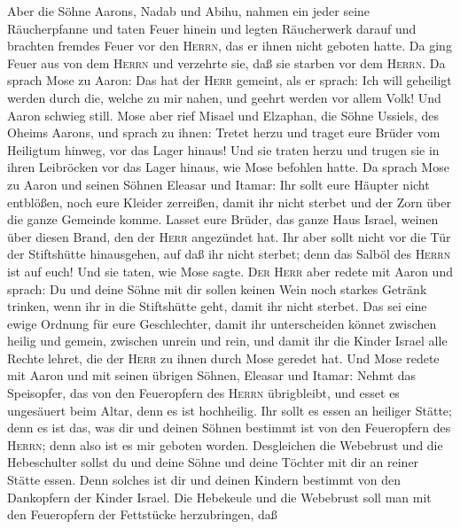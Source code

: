  Aber die Söhne Aarons, Nadab und Abihu, nahmen ein jeder
seine Räucherpfanne und taten Feuer hinein und legten Räucherwerk darauf
und brachten fremdes Feuer vor den \textsc{Herrn}, das er ihnen nicht
geboten hatte.  Da ging Feuer aus von dem \textsc{Herrn}
und verzehrte sie, daß sie starben vor dem \textsc{Herrn}.
 Da sprach Mose zu Aaron: Das hat der \textsc{Herr}
gemeint, als er sprach: Ich will geheiligt werden durch die, welche zu
mir nahen, und geehrt werden vor allem Volk! Und Aaron schwieg still.
 Mose aber rief Misael und Elzaphan, die Söhne Ussiels,
des Oheims Aarons, und sprach zu ihnen: Tretet herzu und traget eure
Brüder vom Heiligtum hinweg, vor das Lager hinaus!  Und
sie traten herzu und trugen sie in ihren Leibröcken vor das Lager
hinaus, wie Mose befohlen hatte.  Da sprach Mose zu Aaron
und seinen Söhnen Eleasar und Itamar: Ihr sollt eure Häupter nicht
entblößen, noch eure Kleider zerreißen, damit ihr nicht sterbet und der
Zorn über die ganze Gemeinde komme. Lasset eure Brüder, das ganze Haus
Israel, weinen über diesen Brand, den der \textsc{Herr} angezündet hat.
 Ihr aber sollt nicht vor die Tür der Stiftshütte
hinausgehen, auf daß ihr nicht sterbet; denn das Salböl des
\textsc{Herrn} ist auf euch! Und sie taten, wie Mose sagte.
 \textsc{Der} \textsc{Herr} aber redete mit Aaron und
sprach:  Du und deine Söhne mit dir sollen keinen Wein
noch starkes Getränk trinken, wenn ihr in die Stiftshütte geht, damit
ihr nicht sterbet. Das sei eine ewige Ordnung für eure Geschlechter,
 damit ihr unterscheiden könnet zwischen heilig und
gemein, zwischen unrein und rein,  und damit ihr die
Kinder Israel alle Rechte lehret, die der \textsc{Herr} zu ihnen durch
Mose geredet hat.  Und Mose redete mit Aaron und mit
seinen übrigen Söhnen, Eleasar und Itamar: Nehmt das Speisopfer, das von
den Feueropfern des \textsc{Herrn} übrigbleibt, und esset es ungesäuert
beim Altar, denn es ist hochheilig.  Ihr sollt es essen
an heiliger Stätte; denn es ist das, was dir und deinen Söhnen bestimmt
ist von den Feueropfern des \textsc{Herrn}; denn also ist es mir geboten
worden.  Desgleichen die Webebrust und die Hebeschulter
sollst du und deine Söhne und deine Töchter mit dir an reiner Stätte
essen. Denn solches ist dir und deinen Kindern bestimmt von den
Dankopfern der Kinder Israel.  Die Hebekeule und die
Webebrust soll man mit den Feueropfern der Fettstücke herzubringen, daß
